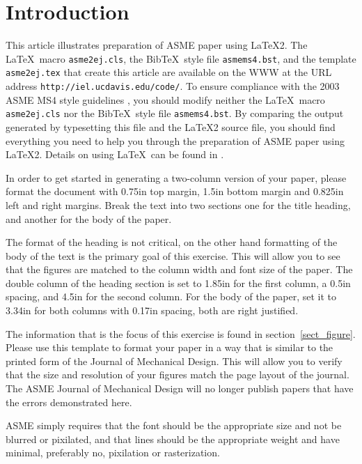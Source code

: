 \documentclass[12pt]{asme2ej}
\begin{document}
    \section{Introduction}

    This article illustrates preparation of ASME paper using \LaTeX2\raisebox{-.3ex}{$\epsilon$}. The \LaTeX\  macro \verb+asme2ej.cls+, the {\sc Bib}\TeX\ style file \verb+asmems4.bst+, and the template \verb+asme2ej.tex+ that create this article are available on the WWW at the URL address \verb+http://iel.ucdavis.edu/code/+. To ensure compliance with the 2003 ASME MS4 style guidelines  \cite{asmemanual}, you should modify neither the \LaTeX\ macro \verb+asme2ej.cls+ nor the {\sc Bib}\TeX\ style file \verb+asmems4.bst+. By comparing the output generated by typesetting this file and the \LaTeX2\raisebox{-.3ex}{$\epsilon$} source file, you should find everything you need to help you through the preparation of ASME paper using \LaTeX2\raisebox{-.3ex}{$\epsilon$}. Details on using \LaTeX\ can be found in \cite{latex}.

    In order to get started in generating a two-column version of your paper, please format the document with 0.75in top margin, 1.5in bottom margin and 0.825in left and right margins. Break the text into two sections one for the title heading, and another for the body of the paper.

    The format of the heading is not critical, on the other hand formatting of the body of the text is the primary goal of this exercise. This will allow you to see that the figures are matched to the column width and font size of the paper. The double column of the heading section is set to 1.85in for the first column, a 0.5in spacing, and 4.5in for the second column. For the body of the paper, set it to 3.34in for both columns with 0.17in spacing, both are right justified.

    The information that is the focus of this exercise is found in
    section~\ref{sect_figure}.
    Please use this template to format your paper in a way that is similar to the printed form of the Journal of Mechanical Design. This will allow you to verify that the size and resolution of your figures match the page layout of the journal. The ASME Journal of Mechanical Design will no longer publish papers that have the errors demonstrated here.

    ASME simply requires that the font should be the appropriate size and not be blurred or pixilated, and that lines should be the appropriate weight and have minimal, preferably no, pixilation or rasterization.
\end{document}
